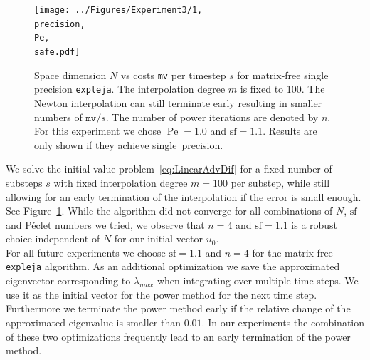 \documentclass{scrartcl}
\begin{document}
	\begin{figure}[h]
		\newcommand{\Pe}{Pe=1.0}
		\newcommand{\precision}{single}
		\newcommand{\safe}{sf=1.1}
		
		\centering
		\texttt{[image: ../Figures/Experiment3/1, \\precision, \\Pe, \\safe.pdf]}
		\caption{Space dimension $N$ vs costs \texttt{mv} per timestep $s$ for matrix-free single precision \texttt{expleja}. The interpolation degree $m$ is fixed to 100. The Newton interpolation can still terminate early resulting in smaller numbers of $\texttt{mv}/s$. The number of power iterations are denoted by $n$. For this experiment we chose $\operatorname{Pe}=1.0$ and $\text{sf}=1.1$. Results are only shown if they achieve \precision\ precision.} \label{fig:Poweriterations}
	\end{figure}
	We solve the initial value problem~\ref{eq:LinearAdvDif} for a fixed number of substeps $s$ with fixed interpolation degree $m=100$ per substep, while still allowing for an early termination of the interpolation if the error is small enough. See Figure~\ref{fig:Poweriterations}. While the algorithm did not converge for all combinations of $N$, $\text{sf}$ and P\'eclet numbers we tried, we observe that $n=4$ and $\text{sf}=1.1$ is a robust choice independent of $N$ for our initial vector $u_0$.\\
	For all future experiments we choose $\text{sf}=1.1$ and $n=4$ for the matrix-free \texttt{expleja} algorithm. As an additional optimization we save the approximated eigenvector corresponding to $\lambda_{max}$ when integrating over multiple time steps. We use it as the initial vector for the power method for the next time step. Furthermore we terminate the power method early if the relative change of the approximated eigenvalue is smaller than $0.01$. In our experiments the combination of these two optimizations frequently lead to an early termination of the power method. 
	
\end{document}
